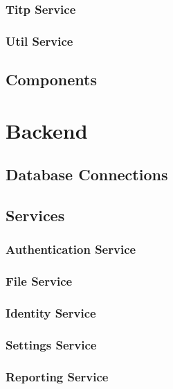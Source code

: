 \subsubsection{Titp Service}

\subsubsection{Util Service}

\subsection{Components}

\section{Backend}

\subsection{Database Connections}

\subsection{Services}

\subsubsection{Authentication Service}

\subsubsection{File Service}

\subsubsection{Identity Service}

\subsubsection{Settings Service}

\subsubsection{Reporting Service}
